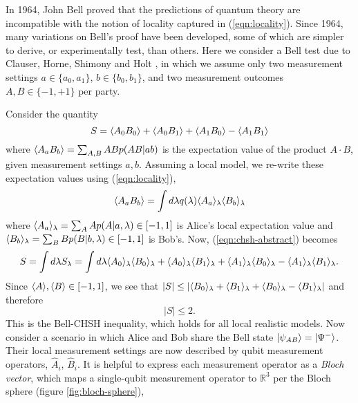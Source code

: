 In 1964, John Bell proved \cite{Bell1964c} that the predictions of quantum theory are incompatible with the notion of locality captured in (\ref{eqn:locality}). Since 1964, many variations on Bell's proof have been developed, some of which are simpler to derive, or experimentally test, than others. Here we consider a Bell test due to Clauser, Horne, Shimony and Holt \cite{Clauser1969}, in which we assume only two measurement settings $a \in \{a_0, a_1\}$, $b \in \{b_0, b_1\}$,  and two measurement outcomes $A, B \in \{-1, +1\}$ per party. 

Consider the quantity
\begin{equation}
S = \langle A_0B_0 \rangle + \langle A_0B_1 \rangle + \langle A_1B_0 \rangle - \langle A_1B_1 \rangle
\label{eqn:chsh-abstract}
\end{equation}
where $\langle A_a B_b \rangle = \sum_{A,B} AB p(AB|ab)$ is the expectation value of the product $A\cdot B$, given measurement settings $a, b$. Assuming a local model, we re-write these expectation values using (\ref{eqn:locality}),
\begin{equation}
\langle A_a B_b \rangle = \int d \lambda q(\lambda) \langle A_a \rangle_\lambda \langle B_b \rangle_\lambda
\end{equation}
where $\langle A_a \rangle_\lambda = \sum_A A p (A | a, \lambda) \in \left[ -1, 1 \right]$ is Alice's local expectation value and $\langle B_b \rangle_\lambda = \sum_B B p (B | b, \lambda) \in \left[ -1, 1 \right]$ is Bob's. Now, (\ref{eqn:chsh-abstract}) becomes
\begin{equation}
S=\int d\lambda S_\lambda = \int d\lambda 
\langle A_0 \rangle_\lambda \langle B_0 \rangle_\lambda + \langle A_0 \rangle_\lambda \langle B_1 \rangle_\lambda + \langle A_1 \rangle_\lambda \langle B_0 \rangle_\lambda - \langle A_1 \rangle_\lambda \langle B_1 \rangle_\lambda.
\end{equation}
Since $\langle A \rangle, \langle B \rangle \in \left[-1, 1\right]$, we see that $|S| \le | \langle B_0 \rangle_\lambda + \langle B_1 \rangle_\lambda + \langle B_0 \rangle_\lambda - \langle B_1 \rangle_\lambda |$  and therefore 
\begin{equation}
|S| \le 2.
\label{eqn:chsh-inequality}
\end{equation}
This is the Bell-CHSH inequality, which holds for all local realistic models.  Now consider a scenario in which Alice and Bob share the Bell state $\mbox{$ | \psi_{AB} \rangle $} = \mbox{$ | \Psi^- \rangle $}$. Their local measurement settings are now described by qubit measurement operators, $\hat{A}_i$, $\hat{B}_i$. It is helpful to express each measurement operator as a \emph{Bloch vector}, which maps a single-qubit measurement operator to $\mathbb{R}^3$ per the Bloch sphere (figure \ref{fig:bloch-sphere}),
